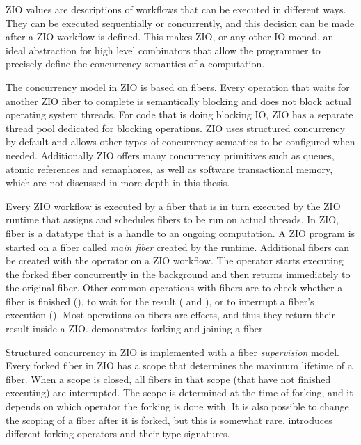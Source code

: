 ZIO values are descriptions of workflows that can be executed in different ways. They can be executed sequentially or concurrently, and this decision can be made after a ZIO workflow is defined. This makes ZIO, or any other IO monad, an ideal abstraction for high level combinators that allow the programmer to precisely define the concurrency semantics of a computation.

The concurrency model in ZIO is based on fibers. Every operation that waits for another ZIO fiber to complete is semantically blocking and does not block actual operating system threads. For code that is doing blocking IO, ZIO has a separate thread pool dedicated for blocking operations. ZIO uses structured concurrency by default and allows other types of concurrency semantics to be configured when needed. Additionally ZIO offers many concurrency primitives such as queues, atomic references and semaphores, as well as software transactional memory, which are not discussed in more depth in this thesis.

Every ZIO workflow is executed by a fiber that is in turn executed by the ZIO runtime that assigns and schedules fibers to be run on actual threads. In ZIO, fiber is a datatype that is a handle to an ongoing computation. A ZIO program is started on a fiber called \emph{main fiber} created by the runtime. Additional fibers can be created with the  operator on a ZIO workflow. The  operator starts executing the forked fiber concurrently in the background and then returns immediately to the original fiber. Other common operations with fibers are to check whether a fiber is finished (), to wait for the result ( and ), or to interrupt a fiber's execution (). Most operations on fibers are effects, and thus they return their result inside a ZIO.  demonstrates forking and joining a fiber.



Structured concurrency in ZIO is implemented with a fiber \emph{supervision} model. Every forked fiber in ZIO has a scope that determines the maximum lifetime of a fiber. When a scope is closed, all fibers in that scope (that have not finished executing) are interrupted. The scope is determined at the time of forking, and it depends on which operator the forking is done with. It is also possible to change the scoping of a fiber after it is forked, but this is somewhat rare.  introduces different forking operators and their type signatures.

